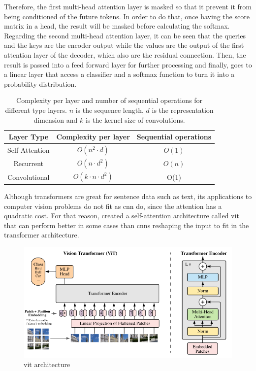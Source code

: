 \documentclass[../main.tex]{subfiles}
\begin{document}
Therefore, the first multi-head attention layer is masked so that it prevent it from being conditioned of the future tokens. In order to do that, once having the score matrix in a head, the result will be masked before calculating the softmax. Regarding the second multi-head attention layer, it can be seen that the queries and the keys are the encoder output while the values are the output of the first attention layer of the decoder, which also are the residual connection. Then, the result is passed into a feed forward layer for further processing and finally, goes to a linear layer that access a classifier and a softmax function to turn it into a probability distribution.
\begin{table}[H]
	\centering
	\caption{Complexity per layer and number of sequential operations for different type layers. $n$ is the sequence length, $d$ is the representation dimension and $k$ is the kernel size of convolutions.}
	\begin{tabular}{c|cc}
		Layer Type & Complexity per layer & Sequential operations\\\hline
		Self-Attention & $O(n^2 \cdot d)$ & $O(1)$\\
		Recurrent & $O(n \cdot d^2)$ & $O(n)$ \\
		Convolutional &  $O(k \cdot n \cdot d^2)$ & O(1)\\
	\end{tabular}
\end{table}
Although transformers are great for sentence data such as text, its applications to computer vision problems do not fit as \gls{cnn} do, since the attention has a quadratic cost. For that reason, \cite{vit} created a self-attention architecture called \gls{vit} that can perform better in some cases than \gls{cnn}s reshaping the input to fit in the transformer architecture.
\begin{figure}[H]
	\centering
	\includegraphics[width=12cm]{imgs/relatedwork/vit-architecture}
	\caption{\gls{vit} architecture}
\end{figure}
\end{document}
